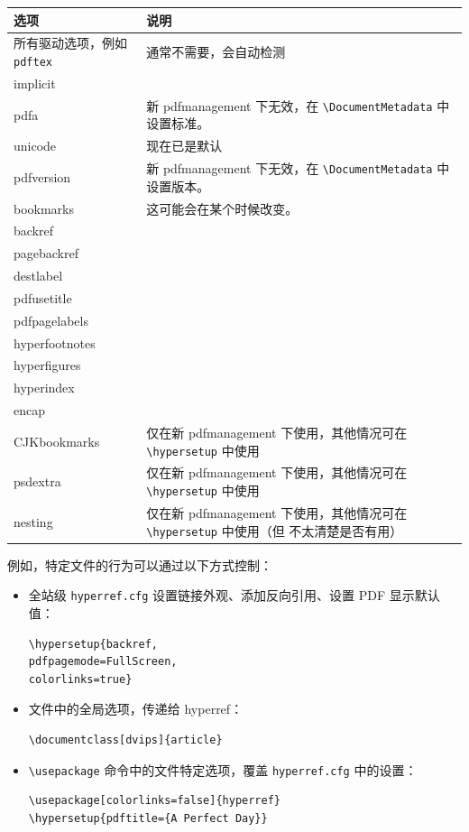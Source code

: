 \documentclass{article}
\newcommand*{\cs}[1]{%
  \texttt{\textbackslash #1}%
}
\newcommand*{\xpackage}[1]{\textsf{#1}}
\begin{document}
\begin{tabular}{>{\ttfamily}l>{\raggedright\arraybackslash}p{5cm}}
选项     & 说明 \\\hline
所有驱动选项，例如 \texttt{pdftex} & 通常不需要，会自动检测\\
implicit   \\
pdfa       & 新 pdfmanagement 下无效，在 \cs{DocumentMetadata} 中设置标准。\\
unicode    & 现在已是默认\\
pdfversion & 新 pdfmanagement 下无效，在 \cs{DocumentMetadata} 中设置版本。\\
bookmarks  & 这可能会在某个时候改变。 \\
backref &\\
pagebackref & \\
destlabel  &\\
pdfusetitle &\\
pdfpagelabels &\\
hyperfootnotes &\\
hyperfigures&\\
hyperindex &\\
encap &\\
CJKbookmarks & 仅在新 pdfmanagement 下使用，其他情况可在 \cs{hypersetup} 中使用\\
psdextra     & 仅在新 pdfmanagement 下使用，其他情况可在 \cs{hypersetup} 中使用\\
nesting      & 仅在新 pdfmanagement 下使用，其他情况可在 \cs{hypersetup} 中使用（但
               不太清楚是否有用）\\

\end{tabular}

例如，特定文件的行为可以通过以下方式控制：
\begin{itemize}

\item	全站级 \texttt{hyperref.cfg} 设置链接外观、添加反向引用、设置 PDF 显示默认值：

\begin{verbatim}
\hypersetup{backref,
pdfpagemode=FullScreen,
colorlinks=true}
\end{verbatim}

\item	文件中的全局选项，传递给 \xpackage{hyperref}：

\begin{verbatim}
\documentclass[dvips]{article}
\end{verbatim}

\item	\cs{usepackage} 命令中的文件特定选项，覆盖 \texttt{hyperref.cfg} 中的设置：

\begin{verbatim}
\usepackage[colorlinks=false]{hyperref}
\hypersetup{pdftitle={A Perfect Day}}
\end{verbatim}
\end{itemize}
\end{document}

